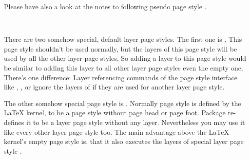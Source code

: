 Please have also a look at the notes to following pseudo page style
.%
%
%
%
%

\begin{Declaration}
  \\
\end{Declaration}
%
%
There are two somehow special, default layer page styles. The first one is
. This page style shouldn't be used normally, but the
layers of this page style will be used by all the other layer page styles. So
adding a layer to this page style would be similar to adding this layer to all
other layer page styles even the empty one. There's one difference: Layer
referencing commands of the page style interface like
, , or
 ignore the layers of
 if they are used for another layer page style.

The other somehow special page style is . Normally page style
 is defined by the \LaTeX{} kernel, to be a page style
without page head or page foot. Package  re-defines it to be
a layer page style without any layer. Nevertheless you may use it like every
other layer page style too. The main advantage above the \LaTeX{} kernel's
empty page style is, that it also executes the layers of special layer page
style .%
%
%

